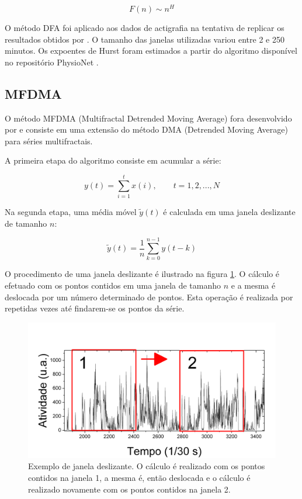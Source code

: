 \documentclass{ufscThesis}
\begin{document}
\begin{equation}
F(n) \sim n^{H}
\end{equation}

O método DFA foi aplicado aos dados de actigrafia na tentativa de replicar os resultados obtidos por . O tamanho das janelas utilizadas variou entre 2 e 250 minutos. Os expoentes de Hurst foram estimados a partir do algoritmo disponível no repositório PhysioNet \cite{Goldberger2000}.

\subsection{MFDMA}
O método MFDMA (Multifractal Detrended Moving Average) fora desenvolvido por  e consiste em uma extensão do método DMA (Detrended Moving Average) \cite{Alessio2002} para séries multifractais. \par
A primeira etapa do algoritmo consiste em acumular a série:

\begin{equation}
y(t) = \sum_{i=1}^{t} x(i), \quad\quad t=1,2,...,N
\label{acumulada}
\end{equation}

Na segunda etapa, uma média móvel $\tilde{y}(t)$ é calculada em uma janela deslizante de tamanho $n$:

\begin{equation}
\tilde{y}(t) = \frac{1}{n} \sum_{k=0}^{n-1} y(t-k)
\label{delizante}
\end{equation} 

O procedimento de uma janela deslizante é ilustrado na figura \ref{slidingwindow}. O cálculo é efetuado com os pontos contidos em uma janela de tamanho $n$ e a mesma é deslocada por um número determinado de pontos. Esta operação é realizada por repetidas vezes até findarem-se os pontos da série.

\begin{figure}[!h]
\centering
\includegraphics[scale=0.25]{slidingwindow.png}
\caption{Exemplo de janela deslizante. O cálculo é realizado com os pontos contidos na janela 1, a mesma é, então deslocada e o cálculo é realizado novamente com os pontos contidos na janela 2.}
\label{slidingwindow}
\end{figure}
\end{document}
